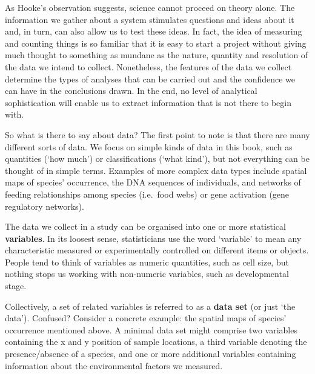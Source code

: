 \documentclass[
]{book}
\begin{document}
As Hooke's observation suggests, science cannot proceed on theory alone. The information we gather about a system stimulates questions and ideas about it and, in turn, can also allow us to test these ideas. In fact, the idea of measuring and counting things is so familiar that it is easy to start a project without giving much thought to something as mundane as the nature, quantity and resolution of the data we intend to collect. Nonetheless, the features of the data we collect determine the types of analyses that can be carried out and the confidence we can have in the conclusions drawn. In the end, no level of analytical sophistication will enable us to extract information that is not there to begin with.

So what is there to say about data? The first point to note is that there are many different sorts of data. We focus on simple kinds of data in this book, such as quantities (`how much') or classifications (`what kind'), but not everything can be thought of in simple terms. Examples of more complex data types include spatial maps of species' occurrence, the DNA sequences of individuals, and networks of feeding relationships among species (i.e.~food webs) or gene activation (gene regulatory networks).

The data we collect in a study can be organised into one or more statistical \textbf{variables}. In its loosest sense, statisticians use the word `variable' to mean any characteristic measured or experimentally controlled on different items or objects. People tend to think of variables as numeric quantities, such as cell size, but nothing stops us working with non-numeric variables, such as developmental stage.

Collectively, a set of related variables is referred to as a \textbf{data set} (or just `the data'). Confused? Consider a concrete example: the spatial maps of species' occurrence mentioned above. A minimal data set might comprise two variables containing the x and y position of sample locations, a third variable denoting the presence/absence of a species, and one or more additional variables containing information about the environmental factors we measured.
\end{document}
